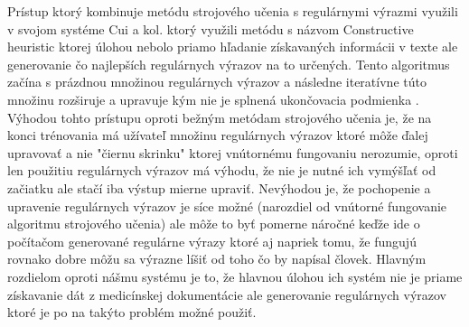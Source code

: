 Prístup ktorý kombinuje metódu strojového učenia 
s regulárnymi výrazmi využili v svojom systéme
Cui a kol. \cite{CHA} ktorý využili metódu s názvom 
Constructive heuristic ktorej úlohou nebolo
priamo hľadanie získavaných informácii v texte ale
generovanie čo najlepších regulárnych výrazov
na to určených. Tento algoritmus začína s
prázdnou množinou regulárnych výrazov a 
následne iteratívne túto množinu rozširuje
a upravuje kým nie je splnená ukončovacia
podmienka \cite{conHeu}. Výhodou tohto prístupu oproti
bežným metódam strojového učenia je, 
že na konci trénovania má užívateľ množinu
regulárnych výrazov ktoré môže ďalej upravovať
a nie "čiernu skrinku" ktorej vnútornému fungovaniu
nerozumie, oproti len použitiu regulárnych výrazov
má výhodu, že nie je nutné ich vymýšľať
od začiatku ale stačí iba výstup mierne upraviť.
Nevýhodou je, že pochopenie a upravenie regulárnych
výrazov je síce možné (narozdiel od vnútorné fungovanie
algoritmu strojového učenia) ale môže to byť pomerne náročné
keďže ide o počítačom generované regulárne výrazy
ktoré aj napriek tomu, že fungujú rovnako dobre môžu
sa výrazne líšiť od toho čo by napísal človek.  
Hlavným rozdielom oproti nášmu systému je to, 
že hlavnou úlohou ich systém nie je priame získavanie
dát z medicínskej dokumentácie ale generovanie 
regulárnych výrazov ktoré je po na takýto problém
možné použiť.


